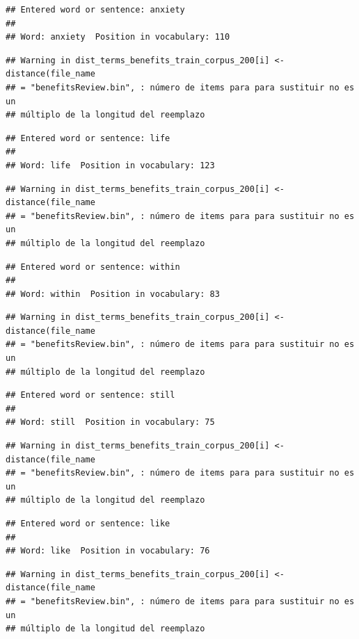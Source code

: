 \documentclass[spanish,]{article}
\begin{document}
\begin{verbatim}
## Entered word or sentence: anxiety
## 
## Word: anxiety  Position in vocabulary: 110
\end{verbatim}

\begin{verbatim}
## Warning in dist_terms_benefits_train_corpus_200[i] <- distance(file_name
## = "benefitsReview.bin", : número de items para para sustituir no es un
## múltiplo de la longitud del reemplazo
\end{verbatim}

\begin{verbatim}
## Entered word or sentence: life
## 
## Word: life  Position in vocabulary: 123
\end{verbatim}

\begin{verbatim}
## Warning in dist_terms_benefits_train_corpus_200[i] <- distance(file_name
## = "benefitsReview.bin", : número de items para para sustituir no es un
## múltiplo de la longitud del reemplazo
\end{verbatim}

\begin{verbatim}
## Entered word or sentence: within
## 
## Word: within  Position in vocabulary: 83
\end{verbatim}

\begin{verbatim}
## Warning in dist_terms_benefits_train_corpus_200[i] <- distance(file_name
## = "benefitsReview.bin", : número de items para para sustituir no es un
## múltiplo de la longitud del reemplazo
\end{verbatim}

\begin{verbatim}
## Entered word or sentence: still
## 
## Word: still  Position in vocabulary: 75
\end{verbatim}

\begin{verbatim}
## Warning in dist_terms_benefits_train_corpus_200[i] <- distance(file_name
## = "benefitsReview.bin", : número de items para para sustituir no es un
## múltiplo de la longitud del reemplazo
\end{verbatim}

\begin{verbatim}
## Entered word or sentence: like
## 
## Word: like  Position in vocabulary: 76
\end{verbatim}

\begin{verbatim}
## Warning in dist_terms_benefits_train_corpus_200[i] <- distance(file_name
## = "benefitsReview.bin", : número de items para para sustituir no es un
## múltiplo de la longitud del reemplazo
\end{verbatim}
\end{document}
